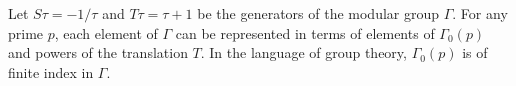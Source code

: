 Let $S\tau = -1/\tau$ and $T\tau = \tau + 1$ be the generators of the modular group $\Gamma$. For any prime $p$, each element of $\Gamma$ can be represented in terms of elements of $\Gamma_0(p)$ and powers of the translation $T$. In the language of group theory, $\Gamma_0(p)$ is of finite index in $\Gamma$.
